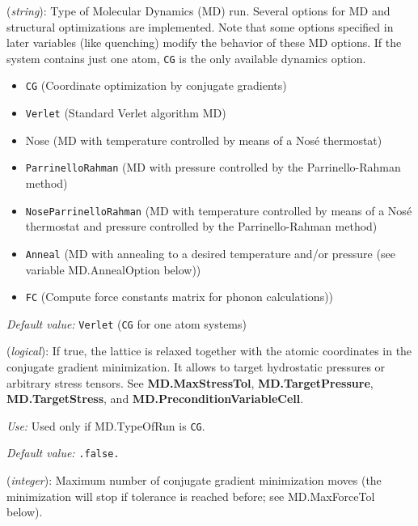 \begin{description}
\itemsep 10pt
\parsep 0pt

\item[{\bf MD.TypeOfRun}] ({\it string}): 
Type of Molecular Dynamics (MD)  run. 
Several options for MD and structural optimizations are 
implemented. Note that some options specified in later variables
(like quenching) modify the behavior of these MD options.
If the system contains just one atom, {\tt CG} is the only 
available dynamics option.
\begin{itemize}
\item {\tt CG} (Coordinate optimization by conjugate gradients)
\item {\tt Verlet} (Standard Verlet algorithm MD)
\item Nose  (MD with temperature controlled  by means of a Nos\'e 
thermostat)
\item {\tt ParrinelloRahman}  (MD with pressure controlled by 
the Parrinello-Rahman method)
\item {\tt NoseParrinelloRahman}  (MD with temperature controlled
by means of a Nos\'e thermostat and pressure controlled by 
the Parrinello-Rahman method)
\item {\tt Anneal}  (MD with annealing to a desired
temperature and/or pressure (see variable MD.AnnealOption below))
\item {\tt FC}  (Compute force constants matrix for phonon
calculations))
\end{itemize}
    
{\it Default value:} {\tt Verlet} ({\tt CG} for one atom systems)


\item[{\bf MD.VariableCell}] ({\it logical}):
If true, the lattice is relaxed together with the atomic coordinates
in the conjugate gradient minimization. It allows to target 
hydrostatic pressures or arbitrary stress tensors.
See {\bf MD.MaxStressTol}, {\bf MD.TargetPressure}, {\bf MD.TargetStress}, and 
{\bf MD.PreconditionVariableCell}.

{\it Use:} Used only if MD.TypeOfRun is {\tt CG}. 

{\it Default value:} {\tt .false.}


\item[{\bf MD.NumCGsteps}] ({\it integer}): 
Maximum number of conjugate gradient minimization
moves (the minimization will stop
if tolerance is reached before; see MD.MaxForceTol below).


\end{description}
